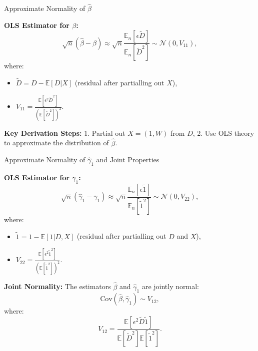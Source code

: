\documentclass[xcolor=svgnames,t]{beamer}
\begin{document}
           
        \begin{frame}{Approximate Normality of \(\hat{\beta}\)}

            \textbf{OLS Estimator for \(\beta\):}
            \[
            \sqrt{n} (\hat{\beta} - \beta) \approx \sqrt{n} \frac{\mathbb{E}_n[\epsilon \tilde{D}]}{\mathbb{E}_n[\tilde{D}^2]} \sim \mathcal{N}(0, V_{11}),
            \]
            where:
            \begin{itemize}
                \item \(\tilde{D} = D - \mathbb{E}[D | X]\) (residual after partialling out \(X\)),
                \item \(V_{11} = \frac{\mathbb{E}[\epsilon^2 \tilde{D}^2]}{(\mathbb{E}[\tilde{D}^2])^2}\).
            \end{itemize}
            
            \textbf{Key Derivation Steps:}
            1. Partial out \(X = (1, W)\) from \(D\),
            2. Use OLS theory to approximate the distribution of \(\hat{\beta}\).
            
            \end{frame}
            
            \begin{frame}{Approximate Normality of \(\hat{\gamma}_1\) and Joint Properties}

                \textbf{OLS Estimator for \(\gamma_1\):}
                \[
                \sqrt{n} (\hat{\gamma}_1 - \gamma_1) \approx \sqrt{n} \frac{\mathbb{E}_n[\epsilon \tilde{1}]}{\mathbb{E}_n[\tilde{1}^2]} \sim \mathcal{N}(0, V_{22}),
                \]
                where:
                \begin{itemize}
                    \item \(\tilde{1} = 1 - \mathbb{E}[1 | D, X]\) (residual after partialling out \(D\) and \(X\)),
                    \item \(V_{22} = \frac{\mathbb{E}[\epsilon^2 \tilde{1}^2]}{(\mathbb{E}[\tilde{1}^2])^2}\).
                \end{itemize}
                
                \textbf{Joint Normality:}
                The estimators \(\hat{\beta}\) and \(\hat{\gamma}_1\) are jointly normal:
                \[
                \text{Cov}(\hat{\beta}, \hat{\gamma}_1) \sim V_{12},
                \]
                where:
                \[
                V_{12} = \frac{\mathbb{E}[\epsilon^2 \tilde{D} \tilde{1}]}{\mathbb{E}[\tilde{D}^2] \mathbb{E}[\tilde{1}^2]}.
                \]
                
                \end{frame}
                
       


    
\end{document}
